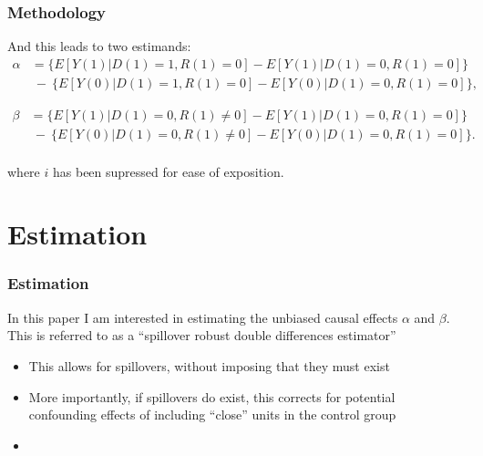 \documentclass[10pt,letterpaper,subeqn]{beamer}
\begin{document}
\begin{frame}[label=method4]
  \frametitle{Methodology}
And this leads to two estimands:
\begin{eqnarray}
\nonumber
\label{Seqn:DDa}
\alpha&=\{E[Y(1)|D(1)=1,R(1)=0]-E[Y(1)|D(1)=0,R(1)=0]\} \\ \nonumber
      &\ -\ \{E[Y(0)|D(1)=1,R(1)=0]-E[Y(0)|D(1)=0,R(1)=0]\}, 
\end{eqnarray}

\begin{eqnarray}
\nonumber
\beta&=\{E[Y(1)|D(1)=0,R(1)\neq 0]-E[Y(1)|D(1)=0,R(1)=0]\} \\ \nonumber
      &\ -\ \{E[Y(0)|D(1)=0,R(1)\neq 0]-E[Y(0)|D(1)=0,R(1)=0]\}. 
\end{eqnarray}
\vspace{3mm} \\
where $i$ has been supressed for ease of exposition.
\end{frame}

\section{Estimation}
\begin{frame}[label=estim]
  \frametitle{Estimation}
In this paper I am interested in estimating the unbiased causal effects $\alpha$ 
and $\beta$.  This is referred to as a ``spillover robust double differences
estimator''
\vspace{4mm}
\begin{itemize}
\item This allows for spillovers, without imposing that they must exist
\item More importantly, if spillovers do exist, this corrects for potential 
confounding effects of including ``close'' units in the control group
\item 
\end{itemize}

\end{frame}
\end{document}
